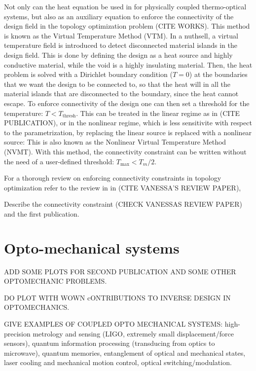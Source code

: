 Not only can the heat equation be used in for physically coupled thermo-optical systems,
but also as an auxiliary equation to enforce the connectivity of the design field in the 
topology optimization problem (CITE WORKS). This method is known as the Virtual Temperature
Method (VTM). In a nuthsell, a virtual temperature field is introduced to detect 
disconnected material islands in the design field. This is done by defining the design as a 
heat source and highly conductive material, while the void is a highly insulating material.
Then, the heat problem is solved with a Dirichlet boundary condition ($T = 0$) at the boundaries
that we want the design to be connected to, so that the heat will in all the
material islands that are disconnected to the boundary, since the heat cannot escape. To enforce
connectivity of the design one can then set a threshold for the temperature: $T < T_\text{thresh}$.
This can be treated in the linear regime as in (CITE PUBLICATION), or in the nonlinear regime, which
is less sensitivite with respect to the parametrization, by replacing the linear source is replaced 
with a nonlinear source:
This is also known as the Nonlinear Virtual Temperature Method (NVMT). With this method, 
the connectivity constraint can be written without the need of a user-defined threshold:
$T_\text{max} < T_m/2$.

For a thorough review on enforcing connectivity constraints in topology optimization
refer to the review in in (CITE VANESSA'S REVIEW PAPER),


Describe the connectivity constraint (CHECK VANESSAS REVIEW PAPER) and the first publication.

\section{Opto-mechanical systems~\cite{ownpub1,ownpub2,ownpub3}}

ADD SOME PLOTS FOR SECOND PUBLICATION AND SOME OTHER OPTOMECHANIC PROBLEMS.

DO PLOT WITH WOWN cONTRIBUTIONS TO INVERSE DESIGN IN OPTOMECHANICS.

GIVE EXAMPLES OF COUPLED OPTO MECHANICAL SYSTEMS: high-precision metrology and sensing (LIGO, extremely small displacement/force sensors),
quantum information processing (transducing from optics to microwave), quantum memories, 
entanglement of optical and mechanical states, laser cooling and mechanical motion control,
optical switching/modulation.

